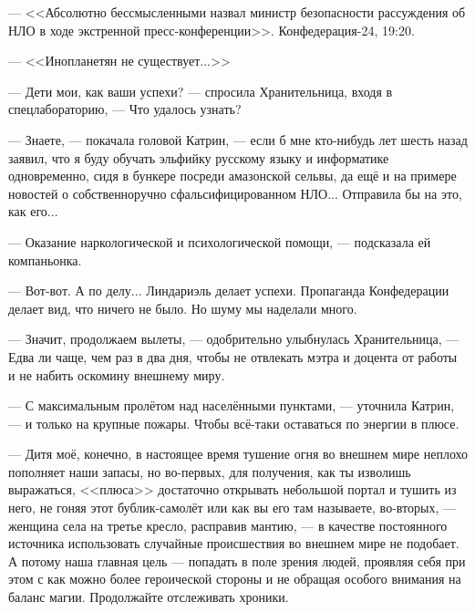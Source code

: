 --- <<Абсолютно бессмысленными назвал министр безопасности рассуждения об НЛО в ходе экстренной пресс-конференции>>.
Конфедерация-24, 19:20.

--- <<Инопланетян не существует...>>

\emptypar

--- Дети мои, как ваши успехи? --- спросила Хранительница, входя в спецлабораторию, --- Что удалось узнать?

--- Знаете, --- покачала головой Катрин, --- если б мне кто-нибудь лет шесть назад заявил,
что я буду обучать эльфийку русскому языку и информатике одновременно, сидя в бункере посреди амазонской сельвы,
да ещё и на примере новостей о собственноручно сфальсифицированном НЛО... Отправила бы на это, как его...

--- Оказание наркологической и психологической помощи, --- подсказала ей компаньонка.

--- Вот-вот. А по делу... Линдариэль делает успехи. Пропаганда Конфедерации делает вид, что ничего не было.
Но шуму мы наделали много.

--- Значит, продолжаем вылеты, --- одобрительно улыбнулась Хранительница,
---  Едва ли чаще, чем раз в два дня, чтобы не отвлекать мэтра и доцента от работы и не набить оскомину внешнему миру.

--- С максимальным пролётом над населёнными пунктами, --- уточнила Катрин,
--- и только на крупные пожары. Чтобы всё-таки оставаться по энергии в плюсе.

--- Дитя моё, конечно, в настоящее время тушение огня во внешнем мире неплохо пополняет наши запасы, но во-первых,
для получения, как ты изволишь выражаться, <<плюса>> достаточно открывать небольшой портал и тушить из него,
не гоняя этот бублик-самолёт или как вы его там называете, во-вторых, --- женщина села на третье кресло, расправив мантию,
--- в качестве постоянного источника использовать случайные происшествия во внешнем мире не подобает.
А потому наша главная цель --- попадать в поле зрения людей,
проявляя себя при этом с как можно более героической стороны и не обращая особого внимания на баланс магии.
Продолжайте отслеживать хроники.

\emptypar

\emptypar
